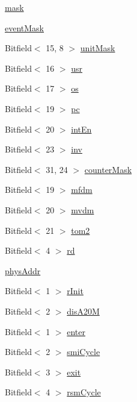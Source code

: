 \begin{DoxyCompactItemize}
\item 
\hyperlink{namespaceX86ISA_a5d76cc2129e79ba1941d2cc2f53b9e8e}{mask}
\item 
\hyperlink{namespaceX86ISA_a6c58344ee0d1b2ec472d5d728a29c338}{eventMask}
\item 
Bitfield$<$ 15, 8 $>$ \hyperlink{namespaceX86ISA_a7c3b650fcd6232eeca27a6cb448eded6}{unitMask}
\item 
Bitfield$<$ 16 $>$ \hyperlink{namespaceX86ISA_ae793913c12b85f8a5a1ab0db202feaae}{usr}
\item 
Bitfield$<$ 17 $>$ \hyperlink{namespaceX86ISA_a6b6e6ba763e7eaf46ac5b6372ca98d30}{os}
\item 
Bitfield$<$ 19 $>$ \hyperlink{namespaceX86ISA_aecb63c74e066ecd98e04d057e39028c9}{pc}
\item 
Bitfield$<$ 20 $>$ \hyperlink{namespaceX86ISA_ada656cc8cdd9d4693b9f6d9df3d700d5}{intEn}
\item 
Bitfield$<$ 23 $>$ \hyperlink{namespaceX86ISA_a0e14d22f7f133424918828db9795c13e}{inv}
\item 
Bitfield$<$ 31, 24 $>$ \hyperlink{namespaceX86ISA_a23736316ac827224f0c4d881d9c2d859}{counterMask}
\item 
Bitfield$<$ 19 $>$ \hyperlink{namespaceX86ISA_a7872f9c6a86e22c69210d82a4c09a1d9}{mfdm}
\item 
Bitfield$<$ 20 $>$ \hyperlink{namespaceX86ISA_acb403d111ee550abef9b833656714ac6}{mvdm}
\item 
Bitfield$<$ 21 $>$ \hyperlink{namespaceX86ISA_a84d4383eedd88ab70592de0622379336}{tom2}
\item 
Bitfield$<$ 4 $>$ \hyperlink{namespaceX86ISA_a398c6d8a9d35ba0d6a038ef071bf49ad}{rd}
\item 
\hyperlink{namespaceX86ISA_a4069fe424ff0ea359df6d44547d14257}{physAddr}
\item 
Bitfield$<$ 1 $>$ \hyperlink{namespaceX86ISA_a3ce01f7fc7a28e6304ff8ca26d42a986}{rInit}
\item 
Bitfield$<$ 2 $>$ \hyperlink{namespaceX86ISA_abbe3c22a13da8716f42f23325f19c04d}{disA20M}
\item 
Bitfield$<$ 1 $>$ \hyperlink{namespaceX86ISA_a51d07173f262dd58a54d4815db07b0a8}{enter}
\item 
Bitfield$<$ 2 $>$ \hyperlink{namespaceX86ISA_a17c00e3556c482fc830e572721ba6e11}{smiCycle}
\item 
Bitfield$<$ 3 $>$ \hyperlink{namespaceX86ISA_aab9b5a2e1cd2f24d08a9872895ded9c9}{exit}
\item 
Bitfield$<$ 4 $>$ \hyperlink{namespaceX86ISA_a89584f716e35a47d819de4eda58e9cdd}{rsmCycle}

\end{DoxyCompactItemize}
